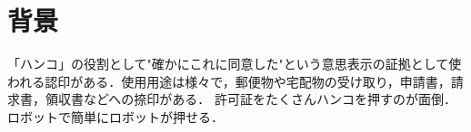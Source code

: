 \section{背景}
「ハンコ」の役割として"確かにこれに同意した"という意思表示の証拠として使われる認印がある．使用用途は様々で，郵便物や宅配物の受け取り，申請書，請求書，領収書などへの捺印がある．
許可証をたくさんハンコを押すのが面倒．
ロボットで簡単にロボットが押せる．
